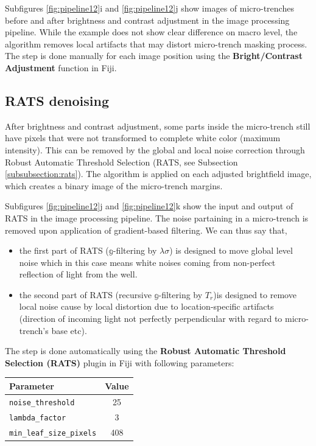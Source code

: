 \documentclass[pdftex,12pt,a4paper]{report}
\begin{document}
Subfigures \ref{fig:pipeline12}i and \ref{fig:pipeline12}j show images of micro-trenches before and after brightness and contrast adjustment in the image processing pipeline. While the example does not show clear difference on macro level, the algorithm removes local artifacts that may distort micro-trench masking process. The step is done manually for each image position using the \textbf{Bright/Contrast Adjustment} function in Fiji.

\subsection{RATS denoising}
\label{subsubsection:rats_denoising}

After brightness and contrast adjustment, some parts inside the micro-trench still have pixels  that were not transformed to complete white color (maximum intensity). This can be removed by the global and local noise correction through Robust Automatic Threshold Selection (RATS, see Subsection \ref{subsubsection:rats}). The algorithm is applied on each adjusted brightfield image, which creates a binary image of the micro-trench margins.

Subfigures \ref{fig:pipeline12}j and \ref{fig:pipeline12}k show the input and output of  RATS in the image processing pipeline. The noise partaining in a micro-trench is removed upon application of gradient-based filtering. We can thus say that,

\begin{itemize}
\item the first part of RATS ($\mathbb{g}$-filtering by $\lambda \sigma$) is designed to move global level noise  which in this case means white noises coming from non-perfect reflection of light from the well.
\item the second part of RATS (recursive $\mathbb{g}$-filtering by $T_r$)is designed to remove local noise cause by local distortion due to location-specific artifacts (direction of incoming light not perfectly perpendicular with regard to micro-trench's base etc).
\end{itemize}

The step is done automatically using the \textbf{Robust Automatic Threshold Selection (RATS)} plugin in Fiji with following parameters:

\begin{table}[H]
\centering
\begin{tabular}[t]{ l | c }
\hline
Parameter & Value \\
\hline\hline
\texttt{noise\_threshold} & 25 \\
\texttt{lambda\_factor} & 3 \\
\texttt{min\_leaf\_size\_pixels} & 408 \\
\hline
\end{tabular}
\end{table}
\end{document}
